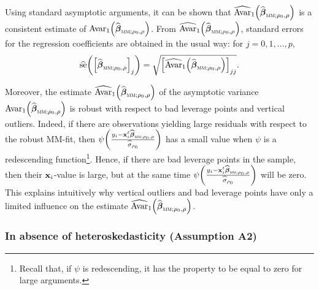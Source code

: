 Using standard asymptotic arguments, it can be shown that $\widehat
{\mathrm{Avar}}_{1}\left(  \sthat{\boldsymbol\beta}_{\stsc{MM};\rho
_{0},\rho}\right)  $ is a consistent estimate of $\mathrm{Avar}_{1}\left(
\sthat{\boldsymbol\beta}_{\stsc{MM};\rho_{0},\rho}\right)  $. From
$\sthat{\mathrm{Avar}}_{1}\left(  \sthat{\boldsymbol\beta}%
_{\stsc{MM};\rho_{0},\rho}\right)  $, standard errors for the regression
coefficients are obtained in the usual way: for $j=0,1,\ldots,p$,
\[
\sthat{\mathrm{se}}\left(  \left[  \sthat{\boldsymbol\beta}%
_{\stsc{MM};\rho_{0},\rho}\right]  _{j}\right)  =\sqrt{\left[
\sthat{\mathrm{Avar}}_{1}\left(  \sthat{\boldsymbol\beta}_{\stsc{MM}%
;\rho_{0},\rho}\right)  \right]  _{jj}}.
\]


Moreover, the estimate $\sthat{\mathrm{Avar}}_{1}\left(  \widehat
{\boldsymbol\beta}_{\stsc{MM};\rho_{0},\rho}\right)  $ of the asymptotic
variance $\mathrm{Avar}_{1}\left(  \sthat{\boldsymbol\beta}_{\stsc{MM}%
;\rho_{0},\rho}\right)  $ is robust with respect to bad leverage points and
vertical outliers. Indeed, if there are observations yielding large residuals
with respect to the robust MM-fit, then $\psi\left(  \frac{y_{i}%
-\stvec{x}_{i}^{t}\sthat{\boldsymbol\beta}_{\stsc{MM};\rho_{0},\rho}%
}{\sthat{\sigma}_{\rho_{0}}}\right)  $ has a small value when $\psi$ is a
redescending function\footnote{Recall that, if $\psi$ is redescending, it has
the property to be equal to zero for large arguments.}. Hence, if there are
bad leverage points in the sample, then their $\mathbf x_{i}$-value is large,
but at the same time $\psi\left(  \frac{y_{i}-\stvec{x}_{i}^{t}%
\sthat{\boldsymbol\beta}_{\stsc{MM};\rho_{0},\rho}}{\sthat{\sigma
}_{\rho_{0}}}\right)  $ will be zero. This explains intuitively why vertical
outliers and bad leverage points have only a limited influence on the estimate
$\sthat{\mathrm{Avar}}_{1}\left(  \sthat{\boldsymbol\beta}%
_{\stsc{MM};\rho_{0},\rho}\right)  $.

\subsubsection{In absence of heteroskedasticity (Assumption A2)}

